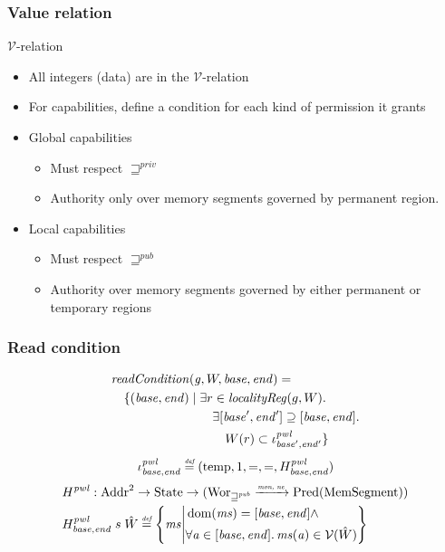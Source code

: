 \documentclass{beamer}
\newcommand{\monnefun}{\xrightarrow{\textit{\tiny{mon, ne}}}}
\newcommand{\fun}{\rightarrow}
\newcommand{\defeq}{\stackrel{\textit{\tiny{def}}}{=}}
\DeclareMathOperator{\dom}{dom}
\newcommand{\var}[1]{\mathit{#1}}
\newcommand{\hs}{\var{ms}}
\newcommand{\gl}{\var{g}}
\newcommand{\addr}{\var{a}}
\newcommand{\start}{\var{base}}
\newcommand{\addrend}{\var{end}}
\newcommand{\pwl}{\var{pwl}}
\newcommand{\plainfun}[2]{
  \ifthenelse{\equal{#2}{}}
  {\mathit{#1}}
  {\mathit{#1}(#2)}
}
\newcommand{\readCond}[1]{\plainfun{readCondition}{#1}}
\newcommand{\futurewk}{\mathbin{\sqsupseteq}^{\var{pub}}}
\newcommand{\futurestr}{\mathbin{\sqsupseteq}^{\var{priv}}}
\newcommand{\asmType}{\plaindom{AsmType}}
\newcommand{\plaindom}[1]{\mathrm{#1}}
\newcommand{\Addrs}{\plaindom{Addr}}
\newcommand{\HeapSegments}{\plaindom{MemSegment}}
\newcommand{\States}{\plaindom{State}}
\newcommand{\Wor}{\plaindom{Wor}}
\newcommand{\Worwk}{\Wor_{\futurewk}}
\newcommand{\UPred}[1]{\plaindom{Pred}(#1)}
\newcommand{\intr}[2]{\mathcal{#1}}
\newcommand{\valueintr}[1]{\intr{V}{#1}}
\newcommand{\stdvr}{\valueintr{\asmType}}
\newcommand{\plainview}[1]{\mathrm{#1}}
\newcommand{\temp}{\plainview{temp}}
\begin{document}
\begin{frame}
  \frametitle{Value relation}
 $\stdvr$-relation
  \begin{itemize}[<+->]
  \item All integers (data) are in the $\stdvr$-relation
  \item For capabilities, define a condition for each kind of permission it grants
  \item Global capabilities
    \begin{itemize}
    \item Must respect $\futurestr$
    \item Authority only over memory segments governed by permanent region.
    \end{itemize}
  \item Local capabilities
    \begin{itemize}
      \item Must respect $\futurewk$
      \item Authority over memory segments governed by either permanent or temporary regions
    \end{itemize}
  \end{itemize}
\end{frame}




\begin{frame}
\frametitle{Read condition}
\begin{align*}
  & \readCond{}(\gl,W,\start,\addrend) =  \\
  & \quad \begin{aligned}[t]
    \{ (\start,\addrend) \mid & \;\exists r \in \var{localityReg}(g,W) \ldotp \\
    & \;\quad \exists [\start',\addrend'] \supseteq [\start,\addrend] \ldotp \\
    & \;\qquad W(r)\subset \iota_{\start',\addrend'}^\pwl \}
  \end{aligned}
\end{align*}
\[
  \iota_{\start,\addrend}^\pwl \defeq (\temp,1,=,=,H^\pwl_{\start,\addrend})
\]
\begin{align*}
  &H^\pwl : \Addrs^2 \fun \States \fun (\Worwk \monnefun \UPred{\HeapSegments})\\
  &H^\pwl_{\start,\addrend}\; s \; \hat{W} \defeq \left\{\hs \middle|
    \begin{aligned}
      &\dom(\hs) = [\start,\addrend] \land \\
      &\forall \addr \in [\start,\addrend] \ldotp \hs(\addr) \in \stdvr(\hat{W})
    \end{aligned}
        \right\}
\end{align*}

\end{frame}
\end{document}
